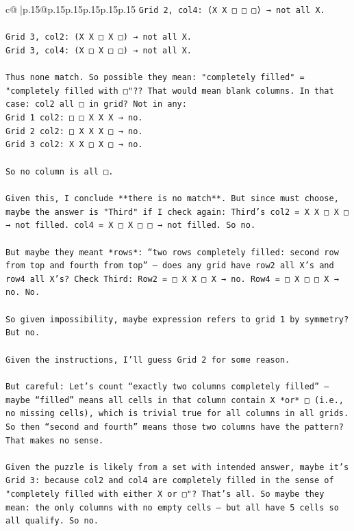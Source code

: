 \documentclass{article}
\begin{document}
{\begin{supertabular}{c@{$\;$}|p{.15\linewidth}@{}p{.15\linewidth}p{.15\linewidth}p{.15\linewidth}p{.15\linewidth}p{.15\linewidth}}
{{{\texttt{Grid 2, col4: (X X □ □ □) → not all X.  } \\
\\ 
\texttt{Grid 3, col2: (X X □ X □) → not all X.  } \\
\texttt{Grid 3, col4: (X □ X □ □) → not all X.  } \\
\\ 
\texttt{Thus none match. So possible they mean: "completely filled" = "completely filled with □"?? That would mean blank columns. In that case: col2 all □ in grid? Not in any:  } \\
\texttt{Grid 1 col2: □ □ X X X → no.  } \\
\texttt{Grid 2 col2: □ X X X □ → no.  } \\
\texttt{Grid 3 col2: X X □ X □ → no.} \\
\\ 
\texttt{So no column is all □.} \\
\\ 
\texttt{Given this, I conclude **there is no match**. But since must choose, maybe the answer is "Third" if I check again: Third’s col2 = X X □ X □ → not filled. col4 = X □ X □ □ → not filled. So no.} \\
\\ 
\texttt{But maybe they meant *rows*: “two rows completely filled: second row from top and fourth from top” — does any grid have row2 all X’s and row4 all X’s? Check Third: Row2 = □ X X □ X → no. Row4 = □ X □ □ X → no. No.} \\
\\ 
\texttt{So given impossibility, maybe expression refers to grid 1 by symmetry? But no.} \\
\\ 
\texttt{Given the instructions, I'll guess Grid 2 for some reason.  } \\
\\ 
\texttt{But careful: Let's count “exactly two columns completely filled” — maybe “filled” means all cells in that column contain X *or* □ (i.e., no missing cells), which is trivial true for all columns in all grids. So then “second and fourth” means those two columns have the pattern? That makes no sense.} \\
\\ 
\texttt{Given the puzzle is likely from a set with intended answer, maybe it’s Grid 3: because col2 and col4 are completely filled in the sense of "completely filled with either X or □"? That’s all. So maybe they mean: the only columns with no empty cells — but all have 5 cells so all qualify. So no.} \\
}}}
\end{supertabular}}
\end{document}
